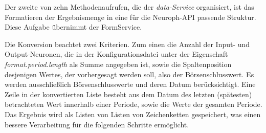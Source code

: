 Der zweite von zehn Methodenaufrufen, die der \emph{data-Service} organisiert, ist das Formatieren der Ergebnismenge in eine für die Neuroph-API passende Struktur. Diese Aufgabe übernimmt der FormService.


%

Die Konversion beachtet zwei Kriterien. Zum einen die Anzahl der Input- und Output-Neuronen, die in der Konfigurationsdatei unter der Eigenschaft \emph{format.period.length} als Summe angegeben ist, sowie die Spaltenposition desjenigen Wertes, der vorhergesagt werden soll, also der Börsenschlusswert.
Es werden ausschließlich Börsenschlusswerte und deren Datum berücksichtigt. Eine Zeile in der konvertierten Liste besteht aus dem Datum des letzten (spätesten) betrachteten Wert innerhalb einer Periode, sowie die Werte der gesamten Periode. Das Ergebnis wird als Listen von Listen von Zeichenketten gespeichert, was einen bessere Verarbeitung für die folgenden Schritte ermöglicht.\\\\

